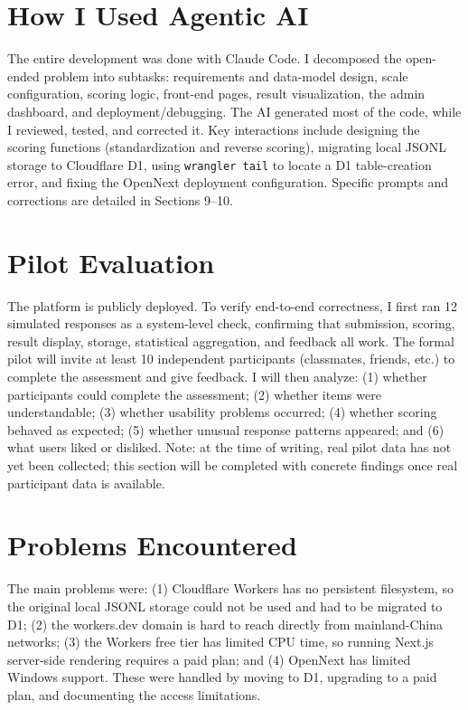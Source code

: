 \documentclass[11pt,a4paper]{article}
\begin{document}
\section{How I Used Agentic AI}

The entire development was done with Claude Code. I decomposed the open-ended problem into subtasks: requirements and data-model design, scale configuration, scoring logic, front-end pages, result visualization, the admin dashboard, and deployment/debugging. The AI generated most of the code, while I reviewed, tested, and corrected it. Key interactions include designing the scoring functions (standardization and reverse scoring), migrating local JSONL storage to Cloudflare D1, using \texttt{wrangler tail} to locate a D1 table-creation error, and fixing the OpenNext deployment configuration. Specific prompts and corrections are detailed in Sections 9--10.

\section{Pilot Evaluation}

The platform is publicly deployed. To verify end-to-end correctness, I first ran 12 simulated responses as a system-level check, confirming that submission, scoring, result display, storage, statistical aggregation, and feedback all work. The formal pilot will invite at least 10 independent participants (classmates, friends, etc.) to complete the assessment and give feedback. I will then analyze: (1) whether participants could complete the assessment; (2) whether items were understandable; (3) whether usability problems occurred; (4) whether scoring behaved as expected; (5) whether unusual response patterns appeared; and (6) what users liked or disliked. Note: at the time of writing, real pilot data has not yet been collected; this section will be completed with concrete findings once real participant data is available.

\section{Problems Encountered}

The main problems were: (1) Cloudflare Workers has no persistent filesystem, so the original local JSONL storage could not be used and had to be migrated to D1; (2) the workers.dev domain is hard to reach directly from mainland-China networks; (3) the Workers free tier has limited CPU time, so running Next.js server-side rendering requires a paid plan; and (4) OpenNext has limited Windows support. These were handled by moving to D1, upgrading to a paid plan, and documenting the access limitations.
\end{document}
